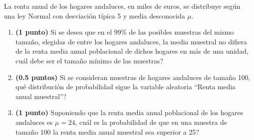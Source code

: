 
La renta anual de los hogares andaluces, en miles de euros, se distribuye
según una ley Normal con desviación típica 5 y media desconocida $\mu$.
\begin{enumerate}[label=\alph*)]
  \item \textbf{(1 punto)} Si se desea que en el 99\% de las posibles
  muestras del mismo tamaño, elegidas de entre los hogares andaluces, la
  media muestral no difiera de la renta media anual poblacional de dichos
  hogares en más de una unidad, \textquestiondown{}cuál debe ser el tamaño
  mínimo de las muestras?
  \item \textbf{(0.5 puntos)} Si se consideran muestras de hogares andaluces
  de tamaño 100, \textquestiondown{}qué distribución de probabilidad sigue
  la variable aleatoria ``Renta media anual muestral''?
  \item \textbf{(1 punto)} Suponiendo que la renta media anual poblacional
  de los hogares andaluces es $\mu=24$, \textquestiondown{}cuál es la
  probabilidad de que en una muestra de tamaño 100 la renta media anual
  muestral sea superior a 25?
\end{enumerate}
